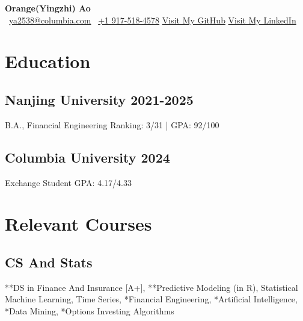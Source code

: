 \documentclass[a4paper]{article}
\newcommand{\org}{\color{org}}
\begin{document}
\fontsize{12pt}{16pt}\selectfont
\begin{center}      
    {\fontsize{25}{25}\selectfont\bfseries Orange(Yingzhi) Ao} \\ \vspace{9pt}
    {\org\faEnvelope[regular]}\ \href{mailto:ya2538@columbia.edu}{ya2538@columbia.com} \hfill
    {\org{}}\ \href{tel:+1 9175184578}{+1 917-518-4578} \hfill
    {\org\faGithub} \href{https://github.com/OrangeAoo}{Visit My GitHub}  \hfill
    {\org\faLinkedin} \href{http://linkedin.com/in/orange-ao}{Visit My LinkedIn}
\end{center}




\section{Education}  %

\subsection{Nanjing University \normalfont \hfill 2021-2025}
B.A., Financial Engineering \hfill Ranking: 3/31 | GPA: 92/100

\subsection{Columbia University  \normalfont \hfill 2024}
Exchange Student \hfill GPA: 4.17/4.33

\section{Relevant Courses}
\subsection{CS And Stats}
**DS in Finance And Insurance {\small[A+]}, **Predictive Modeling {\small(in R)}, Statistical Machine Learning, Time Series, *Financial Engineering, *Artificial Intelligence, *Data Mining, *Options Investing Algorithms
\end{document}
